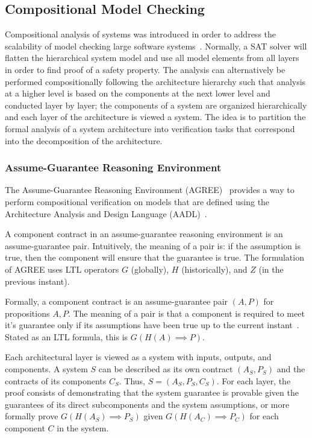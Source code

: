 \subsection{Compositional Model Checking}
\label{compModelChecking}
Compositional analysis of systems was introduced in order to address the scalability of model checking large software systems~\cite{pnueli1985transition, heckel1998compositional, NFM2012:CoGaMiWhLaLu}. Normally, a SAT solver will flatten the hierarchical system model and use all model elements from all layers in order to find proof of a safety property. The analysis can alternatively be performed compositionally following the architecture hierarchy such that analysis at a higher level is based on the components at the next lower level and conducted layer by layer; the components of a system are organized hierarchically and each layer of the architecture is viewed a system. The idea is to partition the formal analysis of a system architecture into verification tasks that correspond into the decomposition of the architecture. 

\subsubsection{Assume-Guarantee Reasoning Environment}
The Assume-Guarantee Reasoning Environment (AGREE)~\cite{cofer2012compositional} provides a way to perform compositional verification on models that are defined using the Architecture Analysis and Design Language (AADL)~\cite{aerospace2012sae}. 

A component contract in an assume-guarantee reasoning environment is an assume-guarantee pair. Intuitively, the meaning of a pair is: if the assumption is true, then the component will ensure that the guarantee is true. The formulation of AGREE uses LTL operators $G$ (globally), $H$ (historically), and $Z$ (in the previous instant).

Formally, a component contract is an assume-guarantee pair $(A,P)$ for propositions $A, P$. The meaning of a pair is that a component is required to meet it's guarantee only if its assumptions have been true up to the current instant~\cite{cofer2012compositional}. Stated as an LTL formula, this is $G(H(A) \implies P)$. 

Each architectural layer is viewed as a system with inputs, outputs, and components. A system $S$ can be described as its own contract $(A_S, P_S)$ and the contracts of its components $C_S$. Thus, $S = (A_S, P_S, C_S)$. For each layer, the proof consists of demonstrating that the system guarantee is provable given the guarantees of its direct subcomponents and the system assumptions, or more formally prove $G(H(A_S) \implies P_S)$ given $G(H(A_C) \implies P_C)$ for each component $C$ in the system.  

